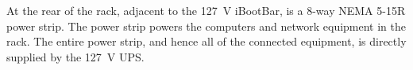 %

At the rear of the rack, adjacent to the 127~V iBootBar, is a 8-way NEMA 5-15R power strip. The power strip powers the computers and network equipment in the rack. The entire power strip, and hence all of the connected equipment, is directly supplied by the 127~V UPS.

